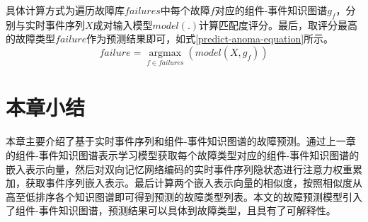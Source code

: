 具体计算方式为遍历故障库$failures$中每个故障$f$对应的组件-事件知识图谱$g_f$，分别与实时事件序列$X$成对输入模型$model(.)$计算匹配度评分。最后，取评分最高的故障类型$failure$作为预测结果即可，如式\ref{predict-anoma-equation}所示。
\begin{equation}
    failure = \mathop{\arg\max}\limits_{f\in failures}( model ( X, g_f)) 
    \label{predict-anoma-equation}   
\end{equation}

\section{本章小结}
本章主要介绍了基于实时事件序列和组件-事件知识图谱的故障预测。通过上一章的组件-事件知识图谱表示学习模型获取每个故障类型对应的组件-事件知识图谱的嵌入表示向量，然后对双向记忆网络编码的实时事件序列隐状态进行注意力权重累加，获取事件序列嵌入表示。最后计算两个嵌入表示向量的相似度，按照相似度从高至低排序各个知识图谱即可得到预测的故障类型列表。本文的故障预测模型引入了组件-事件知识图谱，预测结果可以具体到故障类型，且具有了可解释性。